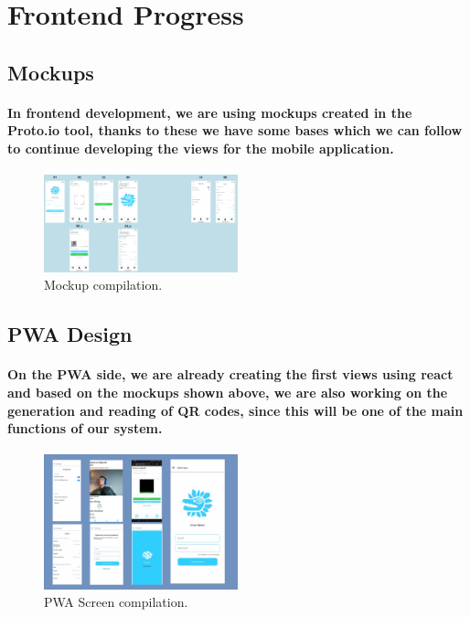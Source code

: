 \documentclass[12pt,a4paper]{article}
\begin{document}
    \clearpage

    \section{Frontend Progress}
    
    \subsection{Mockups}

    \paragraph{In frontend development, we are using mockups created in the Proto.io tool, thanks to these we have some bases which we can follow to continue developing the views for the mobile application.}

    \begin{figure}[ht]
      \centering
      \includegraphics[width=0.5\textwidth]{mockups.png}
      \caption{Mockup compilation.}
    \end{figure}

    \subsection{PWA Design}

    \paragraph{On the PWA side, we are already creating the first views using react and based on the mockups shown above, we are also working on the generation and reading of QR codes, since this will be one of the main functions of our system.}

    \begin{figure}[ht]
      \centering
      \includegraphics[width=0.5\textwidth]{pwa.png}
      \caption{PWA Screen compilation.}
    \end{figure}
	
\end{document}
